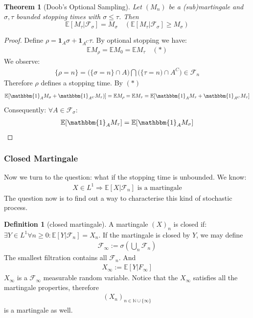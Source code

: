 \documentclass[a4paper,11pt]{book}
\newtheorem{theorem}{Theorem}[section]
\theoremstyle{definition}
\newtheorem{definition}{Definition}[section]
\theoremstyle{remark}
\begin{document}
\begin{theorem}[Doob's Optional Sampling]
	Let $(M_n)$ be a (sub)martingale and $\sigma, \tau$ bounded stopping times with $\sigma \leq \tau$. Then
	\begin{equation*}
		\mathbb{E}[M_\tau| \mathcal{F}_\sigma] = M_\sigma \quad (\mathbb{E}[M_\tau| \mathcal{F}_\sigma] \geq M_\sigma)
	\end{equation*}
\end{theorem}
\begin{proof}
	Define $\rho = \mathbf{1}_A \sigma + \mathbf{1}_{A^C} \tau$. By optional stopping we have:
	\begin{align*}
		\mathbb{E} M_\rho = \mathbb{E} M_0 = \mathbb{E} M_\tau \quad(*)
	\end{align*}
	We observe:
	\begin{align*}
		\{\rho = n \} = \bigg(\{\sigma = n\}\cap A \bigg)\bigcap\bigg(\{\tau = n) \cap A^C\bigg) \in \mathcal{F}_n
	\end{align*}
	Therefore $\rho$ defines a stopping time. By $(*)$ 
	\begin{align*}
		 \mathbb{E}[\mathbbm{1}_{A}M_\sigma + \mathbbm{1}_{A^C} M_\tau)]  = \mathbb{E}M_\rho =
		 \mathbb{E}M_\tau = \mathbb{E}[\mathbbm{1}_{A}M_\tau + \mathbbm{1}_{A^C} M_\tau]
	\end{align*}
		Consequently: $\forall A \in \mathcal{F}_\sigma:$
	\begin{align*}
		\mathbb{E}[\mathbbm{1}_{A} M_\tau ] = \mathbb{E}[\mathbbm{1}_{A}M_\sigma]
	\end{align*}

\end{proof}


\subsubsection*{Closed Martingale}
Now we turn to the question: what if the stopping time is unbounded.
We know:
\begin{align*}
 X \in L^1 \Rightarrow \mathbb{E}[X|\mathcal{F}_n]	\text{ is a martingale}
\end{align*}
The question now is to find out a way to characterise this kind of stochastic process.

\begin{definition}[closed martingale]
A martingale $(X)_n$ is closed if:
$\exists Y \in L^1 \forall n \geq 0: \mathbb{E}[Y|\mathcal{F}_n] = X_n$. 
If the martingale is closed by $Y$, we may define
\begin{align*}
	\mathcal{F}_\infty := \sigma(\bigcup_n \mathcal{F}_n)
\end{align*}
The smallest filtration contains all $\mathcal{F}_n$. And
\begin{align*}
		X_\infty:= \mathbb{E}[Y|F_\infty]
\end{align*}
$X_\infty$ is a $\mathcal{F}_\infty$ measurable random variable. Notice that the $X_\infty$ satisfies all the martingale properties, therefore
\begin{align*}
	(X_n)_{ n \in \mathbb{N} \cup \{\infty\}}
\end{align*}
is a martingale as well. 
\end{definition}
\end{document}
